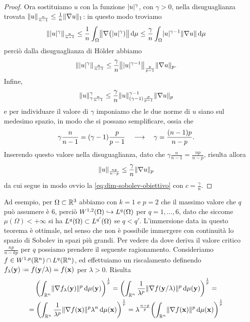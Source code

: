\begin{proof}
    Ora sostituiamo $u$ con la funzione $\abs{u}^\gamma$, con $\gamma>0$, nella disuguaglianza trovata $\norm{u}_\frac{n}{n-1}\le\frac1{n}\norm{\grad u}_1$: in questo modo troviamo
    \begin{equation}
        \norm{\abs{u}^\gamma}_\frac{n}{n-1}\le
        \frac1{n}\int_\Omega\norm[\big]{\grad\big(\abs{u}^\gamma)}\,\dd\mu\le
        \frac{\gamma}{n}\int_\Omega\abs{u}^{\gamma-1}\norm{\grad u}\,\dd\mu
    \end{equation}
    perciò dalla disuguaglianza di Hölder abbiamo
    \begin{equation}
        \norm{\abs{u}^\gamma}_\frac{n}{n-1}\le
        \frac{\gamma}{n}\norm[\big]{\abs{u}^{\gamma-1}}_\frac{p}{p-1}\norm{\grad u}_p.
    \end{equation}
    Infine,
    \begin{equation}
        \norm{u}_{\gamma\frac{n}{n-1}}^\gamma\le
        \frac{\gamma}{n}\norm{u}^{\gamma-1}_{(\gamma-1)\frac{p}{p-1}}\norm{\grad u}_p
    \end{equation}
    e per individuare il valore di $\gamma$ imponiamo che le due norme di $u$ siano sul medesimo spazio, in modo che si possano semplificare, ossia che
    \begin{equation}
        \gamma\frac{n}{n-1}=(\gamma-1)\frac{p}{p-1}
        \qqq
        \gamma=\frac{(n-1)p}{n-p}.
    \end{equation}
    Inserendo questo valore nella disuguaglianza, dato che $\gamma\frac{n}{n-1}=\frac{np}{n-p}$, risulta allora
    \begin{equation}
        \norm{u}_\frac{np}{n-p}\le\frac{\gamma}{n}\norm{\grad u}_p
    \end{equation}
    da cui segue in modo ovvio la \eqref{eq:dim-sobolev-obiettivo} con $c=\frac{\gamma}{n}$.
\end{proof}
Ad esempio, per $\Omega\subset\R^3$ abbiamo con $k=1$ e $p=2$ che il massimo valore che $q$ può assumere è $6$, perciò $\sobW[1,2]{\Omega}\emb\leb[q]{\Omega}$ per $q=1,\dotsc,6$, dato che siccome $\mu(\Omega)<+\infty$ si ha $\leb[q]{\Omega}\subset\leb[q']{\Omega}$ se $q<q'$.
L'immersione data in questo teorema è ottimale, nel senso che non è possibile immergere con continuità lo spazio di Sobolev in spazi più grandi.
Per vedere da dove deriva il valore critico $\frac{np}{n-kp}$ per $q$ possiamo prendere il seguente ragionamento.
Consideriamo $f\in\sobW[1,p]{\R^n}\cap\leb[q]{\R^n}$, ed effettuiamo un riscalamento definendo $f_\lambda(\vec y)\defeq f(\vec y/\lambda)=f(\vec x)$ per $\lambda>0$.
Risulta
\begin{multline}
    \biggl(\int_{\R^n}\norm{\grad f_\lambda(\vec y)}^p\,\dd\mu(\vec y)\biggr)^\frac1{p}=
    \biggl(\int_{\R^n}\frac1{\lambda^p}\norm{\grad f(\vec y/\lambda)}^p\,\dd\mu(\vec y)\biggr)^\frac1{p}=\\=
    \biggl(\int_{\R^n}\frac1{\lambda^p}\norm{\grad f(\vec x)}^p\lambda^n\,\dd\mu(\vec x)\biggr)^\frac1{p}=
    \lambda^\frac{n-p}{p}\biggl(\int_{\R^n}\norm{\grad f(\vec x)}^p\,\dd\mu(\vec x)\biggr)^\frac1{p}
\end{multline}
